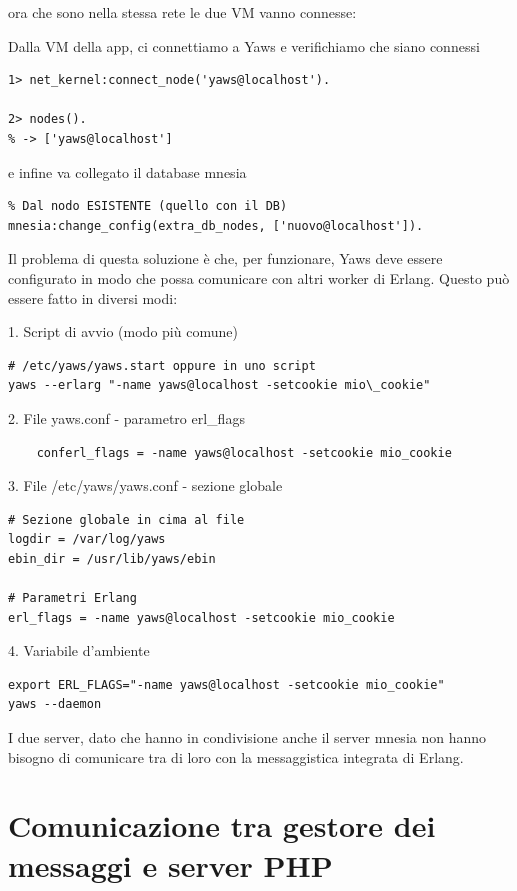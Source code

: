 ora che sono nella stessa rete le due VM vanno connesse:

Dalla VM della app, ci connettiamo a Yaws e verifichiamo che siano connessi
\begin{verbatim}
1> net_kernel:connect_node('yaws@localhost').

2> nodes().
% -> ['yaws@localhost']

\end{verbatim}

e infine va collegato il database mnesia

\begin{verbatim}
% Dal nodo ESISTENTE (quello con il DB)
mnesia:change_config(extra_db_nodes, ['nuovo@localhost']).
\end{verbatim}

Il problema di questa soluzione \`e che, per funzionare, Yaws deve essere configurato in modo che possa comunicare con altri worker di Erlang.
Questo pu\`o essere fatto in diversi modi:

1. Script di avvio (modo pi\`u comune)
\begin{verbatim}
# /etc/yaws/yaws.start oppure in uno script
yaws --erlarg "-name yaws@localhost -setcookie mio\_cookie"
\end{verbatim}

2. File yaws.conf - parametro erl\_flags

\begin{verbatim}
	conferl_flags = -name yaws@localhost -setcookie mio_cookie
\end{verbatim}
 
3. File /etc/yaws/yaws.conf - sezione globale
\begin{verbatim}
# Sezione globale in cima al file
logdir = /var/log/yaws
ebin_dir = /usr/lib/yaws/ebin

# Parametri Erlang
erl_flags = -name yaws@localhost -setcookie mio_cookie
\end{verbatim}

4. Variabile d'ambiente
\begin{verbatim}
export ERL_FLAGS="-name yaws@localhost -setcookie mio_cookie"
yaws --daemon
\end{verbatim}

I due server, dato che hanno in condivisione anche il server mnesia non hanno bisogno di comunicare tra di loro con la messaggistica integrata di Erlang.
 

\section{Comunicazione tra gestore dei messaggi e server PHP}

